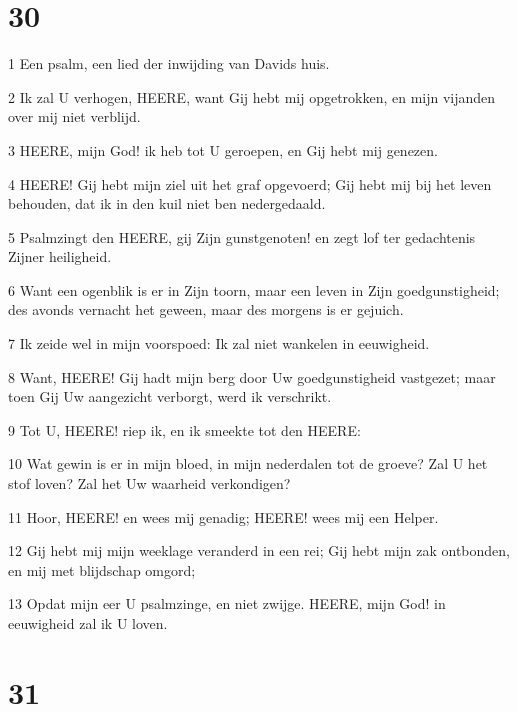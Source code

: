 \chapter{30}

\par 1 Een psalm, een lied der inwijding van Davids huis.
\par 2 Ik zal U verhogen, HEERE, want Gij hebt mij opgetrokken, en mijn vijanden over mij niet verblijd.
\par 3 HEERE, mijn God! ik heb tot U geroepen, en Gij hebt mij genezen.
\par 4 HEERE! Gij hebt mijn ziel uit het graf opgevoerd; Gij hebt mij bij het leven behouden, dat ik in den kuil niet ben nedergedaald.
\par 5 Psalmzingt den HEERE, gij Zijn gunstgenoten! en zegt lof ter gedachtenis Zijner heiligheid.
\par 6 Want een ogenblik is er in Zijn toorn, maar een leven in Zijn goedgunstigheid; des avonds vernacht het geween, maar des morgens is er gejuich.
\par 7 Ik zeide wel in mijn voorspoed: Ik zal niet wankelen in eeuwigheid.
\par 8 Want, HEERE! Gij hadt mijn berg door Uw goedgunstigheid vastgezet; maar toen Gij Uw aangezicht verborgt, werd ik verschrikt.
\par 9 Tot U, HEERE! riep ik, en ik smeekte tot den HEERE:
\par 10 Wat gewin is er in mijn bloed, in mijn nederdalen tot de groeve? Zal U het stof loven? Zal het Uw waarheid verkondigen?
\par 11 Hoor, HEERE! en wees mij genadig; HEERE! wees mij een Helper.
\par 12 Gij hebt mij mijn weeklage veranderd in een rei; Gij hebt mijn zak ontbonden, en mij met blijdschap omgord;
\par 13 Opdat mijn eer U psalmzinge, en niet zwijge. HEERE, mijn God! in eeuwigheid zal ik U loven.

\chapter{31}

